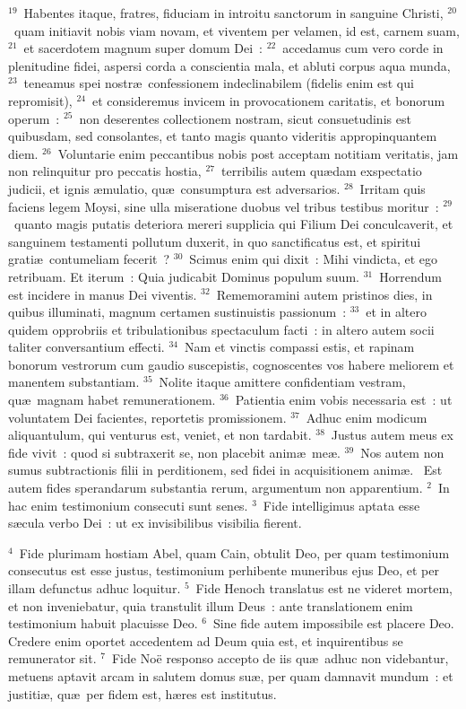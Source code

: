 ${}^{19}$~Habentes itaque, fratres, fiduciam in introitu sanctorum in sanguine Christi,
${}^{20}$~quam initiavit nobis viam novam, et viventem per velamen, id est, carnem suam,
${}^{21}$~et sacerdotem magnum super domum Dei~:
${}^{22}$~accedamus cum vero corde in plenitudine fidei, aspersi corda a conscientia mala, et abluti corpus aqua munda,
${}^{23}$~teneamus spei nostr\ae\ confessionem indeclinabilem (fidelis enim est qui repromisit),
${}^{24}$~et consideremus invicem in provocationem caritatis, et bonorum operum~:
${}^{25}$~non deserentes collectionem nostram, sicut consuetudinis est quibusdam, sed consolantes, et tanto magis quanto videritis appropinquantem diem.
${}^{26}$~Voluntarie enim peccantibus nobis post acceptam notitiam veritatis, jam non relinquitur pro peccatis hostia,
${}^{27}$~terribilis autem qu\ae dam exspectatio judicii, et ignis \ae mulatio, qu\ae\ consumptura est adversarios.
${}^{28}$~Irritam quis faciens legem Moysi, sine ulla miseratione duobus vel tribus testibus moritur~:
${}^{29}$~quanto magis putatis deteriora mereri supplicia qui Filium Dei conculcaverit, et sanguinem testamenti pollutum duxerit, in quo sanctificatus est, et spiritui grati\ae\ contumeliam fecerit~?
${}^{30}$~Scimus enim qui dixit~: Mihi vindicta, et ego retribuam. Et iterum~: Quia judicabit Dominus populum suum.
${}^{31}$~Horrendum est incidere in manus Dei viventis.
${}^{32}$~Rememoramini autem pristinos dies, in quibus illuminati, magnum certamen sustinuistis passionum~:
${}^{33}$~et in altero quidem opprobriis et tribulationibus spectaculum facti~: in altero autem socii taliter conversantium effecti.
${}^{34}$~Nam et vinctis compassi estis, et rapinam bonorum vestrorum cum gaudio suscepistis, cognoscentes vos habere meliorem et manentem substantiam.
${}^{35}$~Nolite itaque amittere confidentiam vestram, qu\ae\ magnam habet remunerationem.
${}^{36}$~Patientia enim vobis necessaria est~: ut voluntatem Dei facientes, reportetis promissionem.
${}^{37}$~Adhuc enim modicum aliquantulum, qui venturus est, veniet, et non tardabit.
${}^{38}$~Justus autem meus ex fide vivit~: quod si subtraxerit se, non placebit anim\ae\ me\ae .
${}^{39}$~Nos autem non sumus subtractionis filii in perditionem, sed fidei in acquisitionem anim\ae .
~Est autem fides sperandarum substantia rerum, argumentum non apparentium.
${}^{2}$~In hac enim testimonium consecuti sunt senes.
${}^{3}$~Fide intelligimus aptata esse s\ae cula verbo Dei~: ut ex invisibilibus visibilia fierent.


${}^{4}$~Fide plurimam hostiam Abel, quam Cain, obtulit Deo, per quam testimonium consecutus est esse justus, testimonium perhibente muneribus ejus Deo, et per illam defunctus adhuc loquitur.
${}^{5}$~Fide Henoch translatus est ne videret mortem, et non inveniebatur, quia transtulit illum Deus~: ante translationem enim testimonium habuit placuisse Deo.
${}^{6}$~Sine fide autem impossibile est placere Deo. Credere enim oportet accedentem ad Deum quia est, et inquirentibus se remunerator sit.
${}^{7}$~Fide No\"e responso accepto de iis qu\ae\ adhuc non videbantur, metuens aptavit arcam in salutem domus su\ae , per quam damnavit mundum~: et justiti\ae , qu\ae\ per fidem est, h\ae res est institutus.


